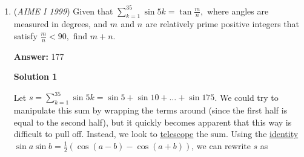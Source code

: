 \begin{enumerate}
 



\textbf{Solution 3}

Instead of working with the four segments, let's focus on their endpoints. When we select these segments, we are working with $4, 5, 6, 7,$ or $8$ endpoints in total. 

 If we have $6, 7,$ or $8$ endpoints, it is easy to see that we cannot form a triangle by drawing four segments between them, because at least one point will be "left out".

 However, if we have $5$ endpoints, we can use three segments form a triangle with three of the points and connect the remaining two points with the last segment. There are ${10\choose5}$ ways to select these $5$ points from the original $10,$ and ${5\choose3}$ ways to decide which three points are in the triangle.

 Finally, if we have $4$ endpoints, we can also form a triangle with three of the points, then use the remaining segment to connect the last point to either of the previous three. We have ${10\choose4}$ ways to select the $4$ points and ${4\choose3}$ ways to choose three points for the triangle. Finally, we must connect the last point to one vertex of the triangle; we can do this in $3$ ways.

 As in Solution 1, there are ${45\choose4}$ total ways to select four segments. So, our desired probability is

 
 \[\dfrac{{10\choose5}{5\choose3}+{10\choose4}{4\choose3}\cdot 3}{{45\choose4}}=\dfrac{16}{473} \implies m + n = \boxed{489}.\]

 --vaporwave

 


	\item (\textit{AIME I 1999}) Given that $\sum_{k=1}^{35}\sin 5k=\tan \frac mn,$ where angles are measured in degrees, and $m_{}$ and $n_{}$ are relatively prime positive integers that satisfy $\frac mn<90,$ find $m+n.$

 \textbf{Answer: }177



\textbf{Solution 1}

Let $s = \sum_{k=1}^{35}\sin 5k  = \sin 5 + \sin 10 + \ldots + \sin 175$. We could try to manipulate this sum by wrapping the terms around (since the first half is equal to the second half), but it quickly becomes apparent that this way is difficult to pull off. Instead, we look to \href{https://artofproblemsolving.com/wiki/index.php?title=Telescope}{telescope} the sum. Using the \href{https://artofproblemsolving.com/wiki/index.php?title=Trigonometric\_identity}{identity} $\sin a \sin b = \frac 12(\cos (a-b) - \cos (a+b))$, we can rewrite $s$ as 


\end{enumerate}
